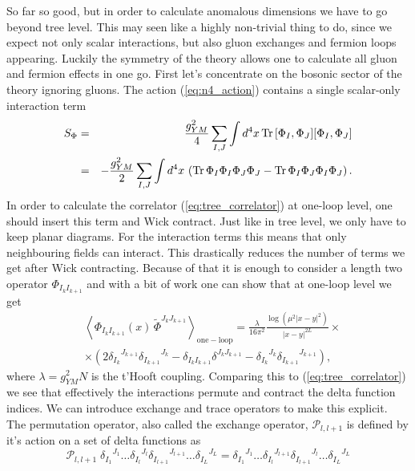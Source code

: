So far so good, but in order to calculate anomalous dimensions we have to go beyond tree level. 
This may seen like a highly non-trivial thing to do, since we expect not only scalar interactions, but also gluon exchanges and fermion loops appearing. 
Luckily the symmetry of the theory allows one to calculate all gluon and fermion effects in one go. 
First let's concentrate on the bosonic sector of the theory ignoring gluons. 
The action (\ref{eq:n4_action}) contains a single scalar-only interaction term
\begin{eqnarray}
S_{\Phi} & = &  \frac{g_{YM}^2}{4} \sum_{I,J} \int d^4 x \, \mathrm{Tr} \, [\Phi_I, \Phi_J] [\Phi_I, \Phi_J] \nonumber \\
& = & - \frac{g_{YM}^2}{2} \sum_{I,J} \int d^4 x \, \left( \mathrm{Tr} \, \Phi_I\Phi_I\Phi_J\Phi_J - \mathrm{Tr} \, \Phi_I\Phi_J\Phi_I\Phi_J \right).
\end{eqnarray} 
In order to calculate the correlator (\ref{eq:tree_correlator}) at one-loop level, one should insert this term and Wick contract. 
Just like in tree level, we only have to keep planar diagrams. 
For the interaction terms this means that only neighbouring fields can interact. 
This drastically reduces the number of terms we get after Wick contracting. 
Because of that it is enough to consider a length two operator $\Phi_{I_k I_{k+1}}$ and with a bit of work one can show that at one-loop level we get
\begin{eqnarray}
	 & \left< \Phi_{I_k I_{k+1}}(x) \, \tilde{\Phi}^{J_k J_{k+1}} \right>_{\mathrm{one-loop}}  = \frac{\lambda}{16\pi^2} \frac{\log (\mu^2|x-y|^2)}{|x-y|^{2L}} \times \nonumber \\ 
	& \times  \left( 2 {\delta_{I_k}}^{J_{k+1}} {\delta_{I_{k+1}}}^{J_{k}} - \delta_{I_k I_{k+1}} \delta^{J_k J_{k+1}} - {\delta_{I_k}}^{J_{k}} {\delta_{I_{k+1}}}^{J_{k+1}} \right),
	\label{eq:loop_correlator}
\end{eqnarray}
where $\lambda = g_{YM}^2 N$ is the t'Hooft coupling. 
Comparing this to (\ref{eq:tree_correlator}) we see that effectively the interactions permute and contract the delta function indices. 
We can introduce exchange and trace operators to make this explicit. 
The permutation operator, also called the exchange operator, $\mathcal{P}_{l,l+1}$ is defined by it's action on a set of delta functions as
\begin{equation}
	\mathcal{P}_{l,l+1} \; {\delta_{I_{1}}}^{J_{1}} \dots {\delta_{I_{l}}}^{J_{l}} {\delta_{I_{l+1}}}^{J_{l+1}} \dots {\delta_{I_{L}}}^{J_{L}} = {\delta_{I_{1}}}^{J_{1}} \dots {\delta_{I_{l}}}^{J_{l+1}} {\delta_{I_{l+1}}}^{J_{l}} \dots {\delta_{I_{L}}}^{J_{L}}
\end{equation}
